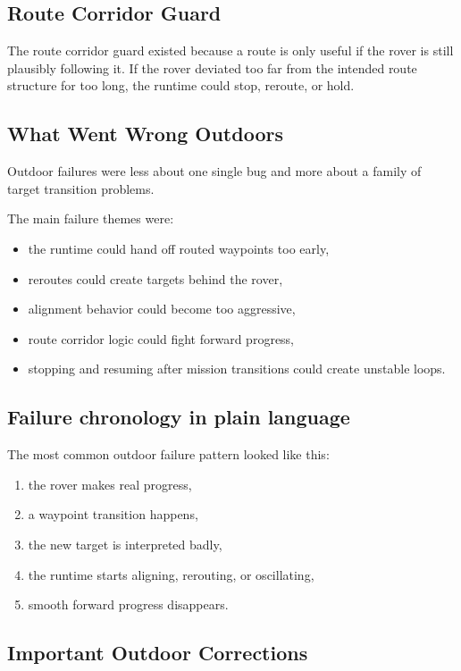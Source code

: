 \documentclass[11pt]{article}
\begin{document}
\subsection{Route Corridor Guard}

The route corridor guard existed because a route is only useful if the rover is
still plausibly following it. If the rover deviated too far from the intended route
structure for too long, the runtime could stop, reroute, or hold.

\subsection{What Went Wrong Outdoors}

Outdoor failures were less about one single bug and more about a family of target
transition problems.

The main failure themes were:

\begin{itemize}[nosep]
  \item the runtime could hand off routed waypoints too early,
  \item reroutes could create targets behind the rover,
  \item alignment behavior could become too aggressive,
  \item route corridor logic could fight forward progress,
  \item stopping and resuming after mission transitions could create unstable loops.
\end{itemize}

\subsection{Failure chronology in plain language}

The most common outdoor failure pattern looked like this:

\begin{enumerate}[nosep]
  \item the rover makes real progress,
  \item a waypoint transition happens,
  \item the new target is interpreted badly,
  \item the runtime starts aligning, rerouting, or oscillating,
  \item smooth forward progress disappears.
\end{enumerate}

\subsection{Important Outdoor Corrections}
\end{document}
